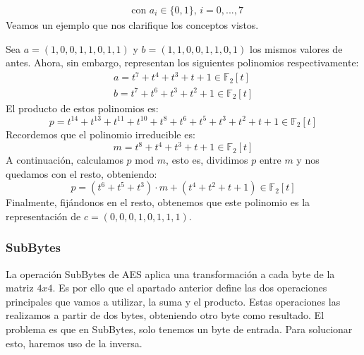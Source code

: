 \begin{itemize}
\begin{align}
            &\text{con } a_{i} \in \{0, 1\} \text{, } i = 0, ... , 7
        \end{align}
        Veamos un ejemplo que nos clarifique los conceptos vistos.
        \begin{ejemplo}
            Sea $a = (1, 0, 0, 1, 1, 0, 1, 1)$ y $b = (1, 1, 0, 0, 1, 1, 0, 1)$ los mismos valores de antes. Ahora, sin embargo, representan los siguientes polinomios respectivamente:
            \begin{align}
                a = t^{7} + t^{4} + t^{3} + t + 1 \in \mathbb{F}_{2}[t] \\
                b = t^{7} + t^{6} + t^{3} + t^{2} + 1 \in \mathbb{F}_{2}[t]
            \end{align}
            El producto de estos polinomios es:
            \begin{equation}
                p = t^{14} + t^{13} + t^{11} + t^{10} + t^{8} + t^{6} + t^{5} + t^{3} + t^{2} + t + 1 \in \mathbb{F}_{2}[t]
            \end{equation}
            Recordemos que el polinomio irreducible es:
            \begin{equation}
                m = t^{8} + t^{4} + t^{3} + t + 1 \in \mathbb{F}_{2}[t]
            \end{equation}
            A continuación, calculamos $p$ mod $m$, esto es, dividimos $p$ entre $m$ y nos quedamos con el resto, obteniendo:
            \begin{equation}
                p = (t^{6} + t^{5} + t^{3}) \cdot m + (t^{4} + t^{2} + t + 1) \in \mathbb{F}_{2}[t]
            \end{equation}
            Finalmente, fijándonos en el resto, obtenemos que este polinomio es la representación de $c = (0, 0, 0, 1, 0, 1, 1, 1)$.
        \end{ejemplo}
    \end{itemize}

    \subsubsection{SubBytes}

    La operación SubBytes de AES aplica una transformación a cada byte de la matriz $4x4$. Es por ello que el apartado anterior define las dos operaciones principales que vamos a utilizar, la suma y el producto. Estas operaciones las realizamos a partir de dos bytes, obteniendo otro byte como resultado. El problema es que en SubBytes, solo tenemos un byte de entrada. Para solucionar esto, haremos uso de la inversa.


